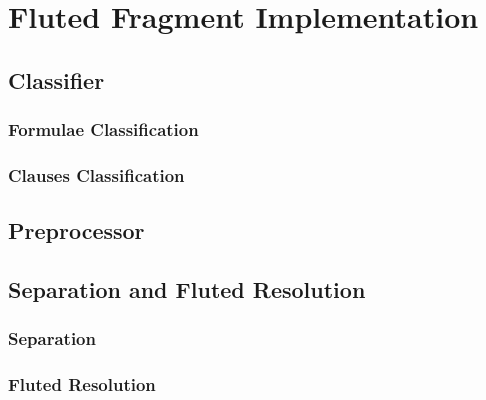 \chapter{Fluted Fragment Implementation}\label{chap:fluted-fragment-implementation}
\section{Classifier}\label{sec:classifier}
\subsection{Formulae Classification}\label{subsec:formulae-classification}
\subsection{Clauses Classification}\label{subsec:clauses-classification}
\section{Preprocessor}\label{sec:preprocessor}
\section{Separation and Fluted Resolution}\label{sec:separation-fluted-resolution}
\subsection{Separation}\label{subsec:separation}
\subsection{Fluted Resolution}\label{subsec:fluted-resolution}




